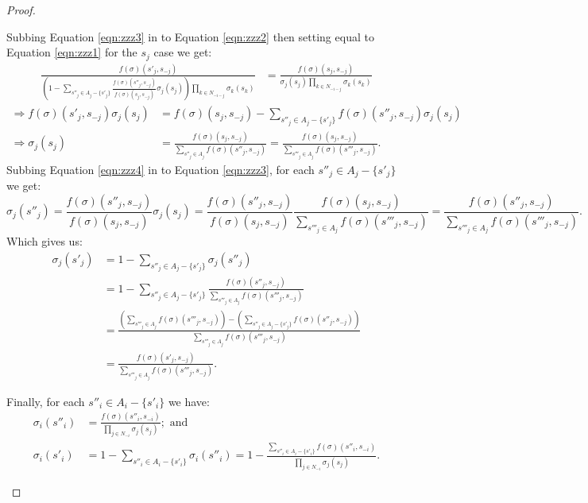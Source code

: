 \begin{proposition}
\begin{proof}
\begin{enumerate}
				Subbing Equation \eqref{eqn:zzz3} in to Equation \eqref{eqn:zzz2} then setting equal to Equation \eqref{eqn:zzz1} for the $s_j$ case we get:
				\begin{align*}
					\frac{f(\sigma)(s'_j, s_{-j})}{\left(1 - \displaystyle\sum_{s''_j \in A_j-\{s'_j\}}\frac{f(\sigma)(s''_j, s_{-j})}{f(\sigma)(s_j, s_{-j})}\sigma_j(s_j)\right)\displaystyle\prod_{k \in N_{-i-j}}\sigma_k(s_k)} &= \frac{f(\sigma)(s_j, s_{-j})}{\sigma_j(s_j)\displaystyle\prod_{k \in N_{-i-j}}\sigma_k(s_k)} 
				\end{align*}
				\begin{align}
					\Rightarrow f(\sigma)(s'_j, s_{-j})\sigma_j(s_j) &= f(\sigma)(s_j, s_{-j}) - \sum_{s''_j \in A_j-\{s'_j\}}f(\sigma)(s''_j, s_{-j})\sigma_j(s_j) \nonumber \\
					\Rightarrow \sigma_j(s_j) &= \frac{f(\sigma)(s_j, s_{-j})}{\displaystyle\sum_{s''_j \in A_j}f(\sigma)(s''_j, s_{-j})} = \frac{f(\sigma)(s_j, s_{-j})}{\displaystyle\sum_{s'''_j \in A_j}f(\sigma)(s'''_j, s_{-j})}. \label{eqn:zzz4}
				\end{align}
				Subbing Equation \eqref{eqn:zzz4} in to Equation \eqref{eqn:zzz3}, for each $s''_j \in A_j-\{s'_j\}$ we get:
				\[
					\sigma_j(s''_j) = \frac{f(\sigma)(s''_j, s_{-j})}{f(\sigma)(s_j, s_{-j})}\sigma_j(s_j) = \frac{f(\sigma)(s''_j, s_{-j})}{f(\sigma)(s_j, s_{-j})}\frac{f(\sigma)(s_j, s_{-j})}{\displaystyle\sum_{s'''_j \in A_j}f(\sigma)(s'''_j, s_{-j})} = \frac{f(\sigma)(s''_j, s_{-j})}{\displaystyle\sum_{s'''_j \in A_j}f(\sigma)(s'''_j, s_{-j})}.
				\]
				Which gives us:
				\begin{align*}
					\sigma_j(s'_j) &= 1 - \sum_{s''_j \in A_j-\{s'_j\}}\sigma_j(s''_j) \\
					&= 1 - \sum_{s''_j \in A_j-\{s'_j\}}\frac{f(\sigma)(s''_j, s_{-j})}{\displaystyle\sum_{s'''_j \in A_j}f(\sigma)(s'''_j, s_{-j})}\\
					&= \frac{\left(\displaystyle\sum_{s'''_j \in A_j}f(\sigma)(s'''_j, s_{-j})\right) - \left(\displaystyle\sum_{s''_j \in A_j-\{s'_j\}}f(\sigma)(s''_j, s_{-j})\right)}{\displaystyle\sum_{s'''_j \in A_j}f(\sigma)(s'''_j, s_{-j})} \\
					&= \frac{f(\sigma)(s'_j, s_{-j})}{\displaystyle\sum_{s'''_j \in A_j}f(\sigma)(s'''_j, s_{-j})}. 
				\end{align*}
				
				Finally, for each $s''_i \in A_i-\{s'_i\}$ we have:
				\begin{align*}
					\sigma_i(s''_i) &= \frac{f(\sigma)(s''_i, s_{-i})}{\displaystyle\prod_{j \in N_{-i}}\sigma_j(s_j)}; \text{ and} \\
					\sigma_i(s'_i) &= 1 - \sum_{s''_i \in A_i-\{s'_i\}}\sigma_i(s''_i) = 1 - \frac{\displaystyle\sum_{s''_i \in A_i-\{s'_i\}}f(\sigma)(s''_i, s_{-i})}{\displaystyle\prod_{j \in N_{-i}}\sigma_j(s_j)}.
				\end{align*}
			\end{enumerate}
			

\end{proof}
\end{proposition}
